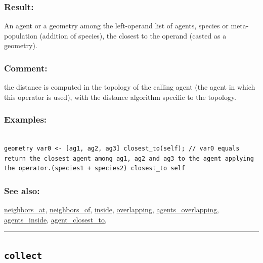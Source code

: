 \documentclass[]{book}
\theoremstyle{definition}
\theoremstyle{definition}
\theoremstyle{definition}
\theoremstyle{remark}
\begin{document}
\subsubsection{Result:}\label{result-87}

An agent or a geometry among the left-operand list of agents, species or
meta-population (addition of species), the closest to the operand
(casted as a geometry).

\subsubsection{Comment:}\label{comment-20}

the distance is computed in the topology of the calling agent (the agent
in which this operator is used), with the distance algorithm specific to
the topology.

\subsubsection{Examples:}\label{examples-68}

\begin{verbatim}
 
geometry var0 <- [ag1, ag2, ag3] closest_to(self); // var0 equals return the closest agent among ag1, ag2 and ag3 to the agent applying the operator.(species1 + species2) closest_to self 
\end{verbatim}

\subsubsection{See also:}\label{see-also-54}

\href{operators-n-to-r.html\#neighbors_at}{neighbors\_at},
\href{operators-n-to-r.html\#neighbors_of}{neighbors\_of},
\href{operators-i-to-m.html\#inside}{inside},
\href{operators-n-to-r.html\#overlapping}{overlapping},
\href{operators-a-to-a.html\#agents_overlapping}{agents\_overlapping},
\href{operators-a-to-a.html\#agents_inside}{agents\_inside},
\href{operators-a-to-a.html\#agent_closest_to}{agent\_closest\_to},

\begin{center}\rule{0.5\linewidth}{\linethickness}\end{center}

\subsection{\texorpdfstring{\texttt{collect}}{collect}}\label{collect}
\end{document}
